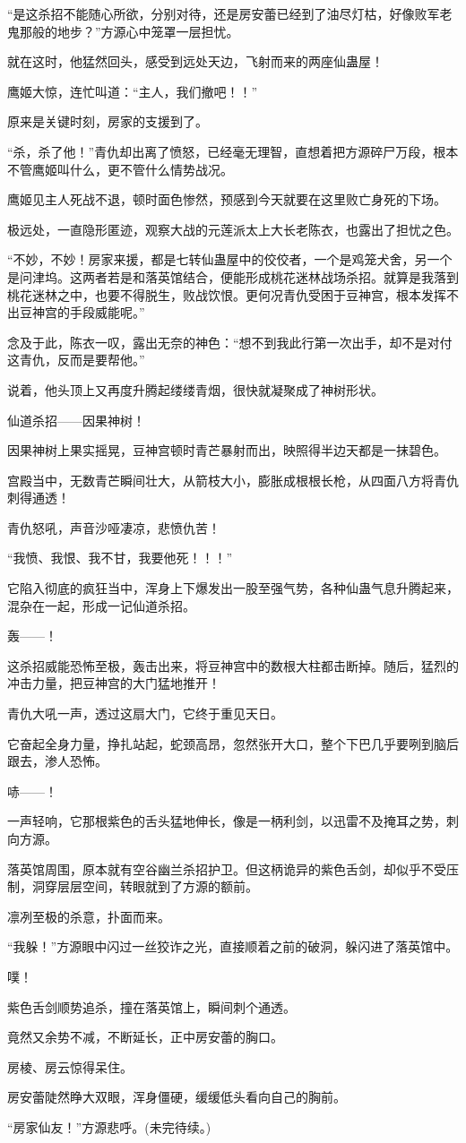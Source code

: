 \begin{this_body}
“是这杀招不能随心所欲，分别对待，还是房安蕾已经到了油尽灯枯，好像败军老鬼那般的地步？”方源心中笼罩一层担忧。

就在这时，他猛然回头，感受到远处天边，飞射而来的两座仙蛊屋！

鹰姬大惊，连忙叫道：“主人，我们撤吧！！”

原来是关键时刻，房家的支援到了。

“杀，杀了他！”青仇却出离了愤怒，已经毫无理智，直想着把方源碎尸万段，根本不管鹰姬叫什么，更不管什么情势战况。

鹰姬见主人死战不退，顿时面色惨然，预感到今天就要在这里败亡身死的下场。

极远处，一直隐形匿迹，观察大战的元莲派太上大长老陈衣，也露出了担忧之色。

“不妙，不妙！房家来援，都是七转仙蛊屋中的佼佼者，一个是鸡笼犬舍，另一个是问津坞。这两者若是和落英馆结合，便能形成桃花迷林战场杀招。就算是我落到桃花迷林之中，也要不得脱生，败战饮恨。更何况青仇受困于豆神宫，根本发挥不出豆神宫的手段威能呢。”

念及于此，陈衣一叹，露出无奈的神色：“想不到我此行第一次出手，却不是对付这青仇，反而是要帮他。”

说着，他头顶上又再度升腾起缕缕青烟，很快就凝聚成了神树形状。

仙道杀招——因果神树！

因果神树上果实摇晃，豆神宫顿时青芒暴射而出，映照得半边天都是一抹碧色。

宫殿当中，无数青芒瞬间壮大，从箭枝大小，膨胀成根根长枪，从四面八方将青仇刺得通透！

青仇怒吼，声音沙哑凄凉，悲愤仇苦！

“我愤、我恨、我不甘，我要他死！！！”

它陷入彻底的疯狂当中，浑身上下爆发出一股至强气势，各种仙蛊气息升腾起来，混杂在一起，形成一记仙道杀招。

轰——！

这杀招威能恐怖至极，轰击出来，将豆神宫中的数根大柱都击断掉。随后，猛烈的冲击力量，把豆神宫的大门猛地推开！

青仇大吼一声，透过这扇大门，它终于重见天日。

它奋起全身力量，挣扎站起，蛇颈高昂，忽然张开大口，整个下巴几乎要咧到脑后跟去，渗人恐怖。

哧——！

一声轻响，它那根紫色的舌头猛地伸长，像是一柄利剑，以迅雷不及掩耳之势，刺向方源。

落英馆周围，原本就有空谷幽兰杀招护卫。但这柄诡异的紫色舌剑，却似乎不受压制，洞穿层层空间，转眼就到了方源的额前。

凛冽至极的杀意，扑面而来。

“我躲！”方源眼中闪过一丝狡诈之光，直接顺着之前的破洞，躲闪进了落英馆中。

噗！

紫色舌剑顺势追杀，撞在落英馆上，瞬间刺个通透。

竟然又余势不减，不断延长，正中房安蕾的胸口。

房棱、房云惊得呆住。

房安蕾陡然睁大双眼，浑身僵硬，缓缓低头看向自己的胸前。

“房家仙友！”方源悲呼。(未完待续。)

\end{this_body}

